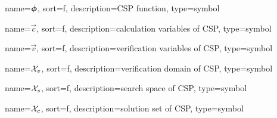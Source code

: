 	{%
		name=\ensuremath{\vecfunc{\phi}},
		sort=f,
		description=CSP function,
		type=symbol
	}
	\newcommand{\cspfunc}{\gls{sym:cspfunc}}

	{%
		name=\ensuremath{\vec{c}},
		sort=f,
		description=calculation variables of CSP,
		type=symbol
	}
	\newcommand{\calcvars}{\gls{sym:calcvars}}

	{%
		name=\ensuremath{\vec{v}},
		sort=f,
		description=verification variables of CSP,
		type=symbol
	}
	\newcommand{\vervars}{\gls{sym:vervars}}

	{%
		name=\ensuremath{\set{X}_{v}},
		sort=f,
		description=verification domain of CSP,
		type=symbol
	}
	\newcommand{\verdomain}{\gls{sym:verdomain}}

	{%
		name=\ensuremath{\set{X}_{s}},
		sort=f,
		description=search space of CSP,
		type=symbol
	}
	\newcommand{\cspsearchspace}{\gls{sym:cspsearchspace}}

	{%
		name=\ensuremath{\set{X}_{c}},
		sort=f,
		description=solution set of CSP,
		type=symbol
	}
	\newcommand{\cspsolutionset}{\gls{sym:cspsolutionset}}
